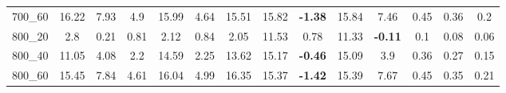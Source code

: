 \begin{tabular}{c|ccccccccccccc}
700\_60      & 16.22        & 7.93         & 4.9          & 15.99        & 4.64         & 15.51        & 15.82        & {\bf -1.38}  & 15.84        & 7.46         & 0.45         & 0.36         & 0.2          \\ 
800\_20      & 2.8          & 0.21         & 0.81         & 2.12         & 0.84         & 2.05         & 11.53        & 0.78         & 11.33        & {\bf -0.11}  & 0.1          & 0.08         & 0.06         \\ 
800\_40      & 11.05        & 4.08         & 2.2          & 14.59        & 2.25         & 13.62        & 15.17        & {\bf -0.46}  & 15.09        & 3.9          & 0.36         & 0.27         & 0.15         \\ 
800\_60      & 15.45        & 7.84         & 4.61         & 16.04        & 4.99         & 16.35        & 15.37        & {\bf -1.42}  & 15.39        & 7.67         & 0.45         & 0.35         & 0.21         \\ 
\end{tabular}